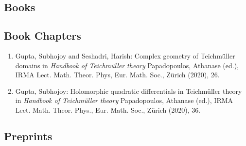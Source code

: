 \subsection{Books}



\subsection{Book Chapters}

\begin{enumerate}
\item Gupta, Subhojoy and Seshadri, Harish: Complex geometry of Teichmüller domains in {\em Handbook of Teichmüller theory} Papadopoulos, Athanase (ed.), IRMA Lect. Math. Theor. Phys, Eur. Math. Soc., Zürich (2020), 26.
\item Gupta, Subhojoy: Holomorphic quadratic differentials in Teichmüller theory in {\em Handbook of Teichmüller theory} Papadopoulos, Athanase (ed.), IRMA Lect. Math. Theor. Phys., Eur. Math. Soc., Zürich (2020), 36.
\end{enumerate}


\subsection{Preprints}

